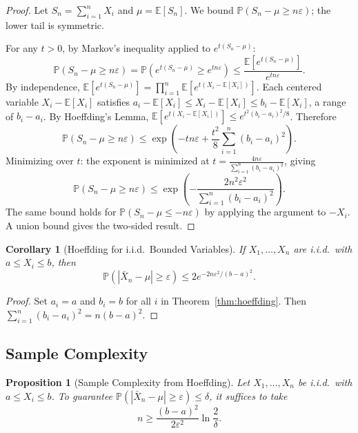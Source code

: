 \documentclass[11pt,a4paper]{article}
\theoremstyle{definition}
\theoremstyle{plain}
\newtheorem{proposition}[theorem]{Proposition}
\newtheorem{corollary}[theorem]{Corollary}
\theoremstyle{remark}
\newcommand{\E}{\mathbb{E}}
\newcommand{\Prob}{\mathbb{P}}
\begin{document}
\begin{proof}
Let $S_n = \sum_{i=1}^n X_i$ and $\mu = \E[S_n]$. We bound $\Prob(S_n - \mu \geq n\varepsilon)$;
the lower tail is symmetric.

For any $t > 0$, by Markov's inequality applied to $e^{t(S_n - \mu)}$:
\[
    \Prob(S_n - \mu \geq n\varepsilon)
    = \Prob(e^{t(S_n - \mu)} \geq e^{tn\varepsilon})
    \leq \frac{\E[e^{t(S_n - \mu)}]}{e^{tn\varepsilon}}.
\]
By independence, $\E[e^{t(S_n - \mu)}] = \prod_{i=1}^n \E[e^{t(X_i - \E[X_i])}]$. Each
centered variable $X_i - \E[X_i]$ satisfies $a_i - \E[X_i] \leq X_i - \E[X_i] \leq
b_i - \E[X_i]$, a range of $b_i - a_i$. By Hoeffding's Lemma,
$\E[e^{t(X_i - \E[X_i])}] \leq e^{t^2(b_i - a_i)^2/8}$. Therefore
\[
    \Prob(S_n - \mu \geq n\varepsilon) \leq \exp\!\left(-tn\varepsilon +
    \frac{t^2}{8}\sum_{i=1}^n(b_i - a_i)^2\right).
\]
Minimizing over $t$: the exponent is minimized at
$t = \frac{4n\varepsilon}{\sum_{i=1}^n(b_i-a_i)^2}$, giving
\[
    \Prob(S_n - \mu \geq n\varepsilon) \leq \exp\!\left(-\frac{2n^2\varepsilon^2}{\sum_{i=1}^n(b_i-a_i)^2}\right).
\]
The same bound holds for $\Prob(S_n - \mu \leq -n\varepsilon)$ by applying the argument to
$-X_i$. A union bound gives the two-sided result.
\end{proof}

\begin{corollary}[Hoeffding for i.i.d.\ Bounded Variables]
\label{cor:hoeffding_iid}
If $X_1, \ldots, X_n$ are i.i.d.\ with $a \leq X_i \leq b$, then
\[
    \Prob(|\bar{X}_n - \mu| \geq \varepsilon) \leq 2e^{-2n\varepsilon^2/(b-a)^2}.
\]
\end{corollary}

\begin{proof}
Set $a_i = a$ and $b_i = b$ for all $i$ in Theorem~\ref{thm:hoeffding}. Then
$\sum_{i=1}^n(b_i - a_i)^2 = n(b-a)^2$.
\end{proof}

\subsection{Sample Complexity}

\begin{proposition}[Sample Complexity from Hoeffding]
\label{prop:sample_complexity}
Let $X_1, \ldots, X_n$ be i.i.d.\ with $a \leq X_i \leq b$. To guarantee
$\Prob(|\bar{X}_n - \mu| \geq \varepsilon) \leq \delta$, it suffices to take
\[
    n \geq \frac{(b-a)^2}{2\varepsilon^2}\ln\frac{2}{\delta}.
\]
\end{proposition}
\end{document}
